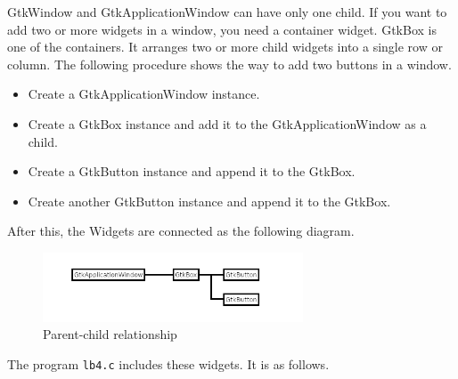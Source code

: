 GtkWindow and GtkApplicationWindow can have only one child. If you want
to add two or more widgets in a window, you need a container widget.
GtkBox is one of the containers. It arranges two or more child widgets
into a single row or column. The following procedure shows the way to
add two buttons in a window.

\begin{itemize}
\tightlist
\item
  Create a GtkApplicationWindow instance.
\item
  Create a GtkBox instance and add it to the GtkApplicationWindow as a
  child.
\item
  Create a GtkButton instance and append it to the GtkBox.
\item
  Create another GtkButton instance and append it to the GtkBox.
\end{itemize}

After this, the Widgets are connected as the following diagram.

\begin{figure}
\centering
\includegraphics[width=7.725cm,height=2.055cm]{../image/box.png}
\caption{Parent-child relationship}
\end{figure}

The program \passthrough{\lstinline!lb4.c!} includes these widgets. It
is as follows.


